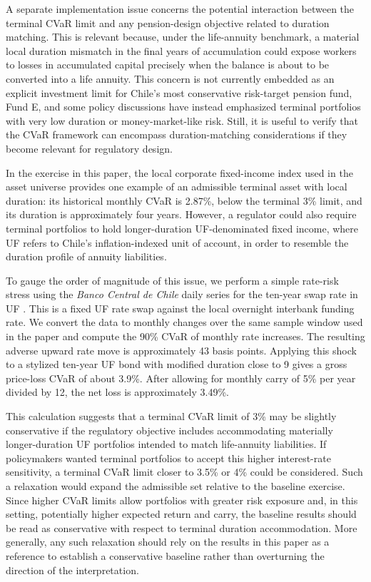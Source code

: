 \documentclass[11pt]{article}
\begin{document}
A separate implementation issue concerns the potential interaction between the terminal CVaR limit and any pension-design objective related to duration matching. This is relevant because, under the life-annuity benchmark, a material local duration mismatch in the final years of accumulation could expose workers to losses in accumulated capital precisely when the balance is about to be converted into a life annuity. This concern is not currently embedded as an explicit investment limit for Chile's most conservative risk-target pension fund, Fund E, and some policy discussions have instead emphasized terminal portfolios with very low duration or money-market-like risk. Still, it is useful to verify that the CVaR framework can encompass duration-matching considerations if they become relevant for regulatory design.

In the exercise in this paper, the local corporate fixed-income index used in the asset universe provides one example of an admissible terminal asset with local duration: its historical monthly CVaR is 2.87\%, below the terminal 3\% limit, and its duration is approximately four years. However, a regulator could also require terminal portfolios to hold longer-duration UF-denominated fixed income, where UF refers to Chile's inflation-indexed unit of account, in order to resemble the duration profile of annuity liabilities.

To gauge the order of magnitude of this issue, we perform a simple rate-risk stress using the \emph{Banco Central de Chile} daily series for the ten-year swap rate in UF \cite{bcchSpcUf10}. This is a fixed UF rate swap against the local overnight interbank funding rate. We convert the data to monthly changes over the same sample window used in the paper and compute the 90\% CVaR of monthly rate increases. The resulting adverse upward rate move is approximately 43 basis points. Applying this shock to a stylized ten-year UF bond with modified duration close to 9 gives a gross price-loss CVaR of about 3.9\%. After allowing for monthly carry of 5\% per year divided by 12, the net loss is approximately 3.49\%.

This calculation suggests that a terminal CVaR limit of 3\% may be slightly conservative if the regulatory objective includes accommodating materially longer-duration UF portfolios intended to match life-annuity liabilities. If policymakers wanted terminal portfolios to accept this higher interest-rate sensitivity, a terminal CVaR limit closer to 3.5\% or 4\% could be considered. Such a relaxation would expand the admissible set relative to the baseline exercise. Since higher CVaR limits allow portfolios with greater risk exposure and, in this setting, potentially higher expected return and carry, the baseline results should be read as conservative with respect to terminal duration accommodation. More generally, any such relaxation should rely on the results in this paper as a reference to establish  a conservative baseline rather than overturning the direction of the interpretation.
\fi
\end{document}
